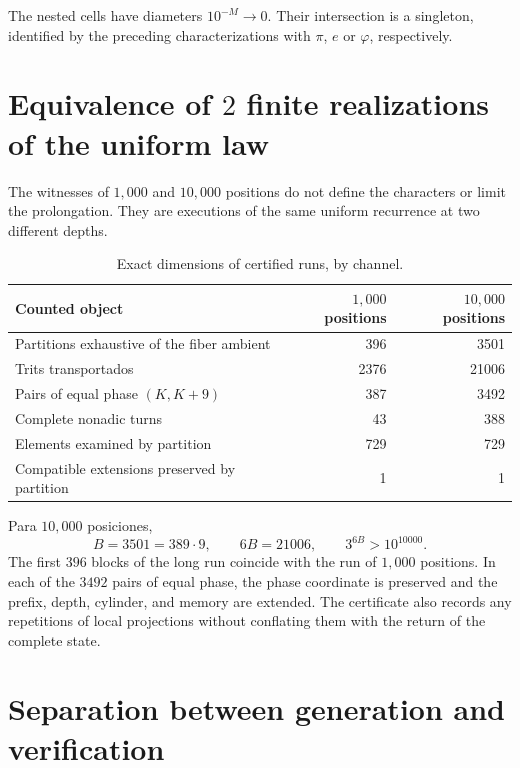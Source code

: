 \begin{corollary}
The nested cells have diameters \(10^{-M}\to0\). Their intersection is
a singleton, identified by the preceding characterizations with
\(\pi\), \(e\) or \(\varphi\), respectively.
\end{corollary}

\section{Equivalence of \(2\) finite realizations of the uniform law}

The witnesses of \(1,000\) and \(10,000\) positions do not define the
characters or limit the prolongation. They are executions of the same uniform
recurrence at two different depths.

\begin{table}[htbp]
\centering
\caption{Exact dimensions of certified runs, by channel.}
\label{gfp:b:tab:dimensiones-ejecuciones-1000-10000}
\begin{tabular}{lrr}
\toprule
Counted object & \(1,000\) positions & \(10,000\) positions\\
\midrule
Partitions exhaustive of the fiber ambient & 396 & 3501\\
Trits transportados & 2376 & 21006\\
Pairs of equal phase \((K,K+9)\) & 387 & 3492\\
Complete nonadic turns & 43 & 388\\
Elements examined by partition & 729 & 729\\
Compatible extensions preserved by partition & 1 & 1\\
\bottomrule
\end{tabular}
\end{table}

Para \(10,000\) posiciones,
\[
 B=3501=389\cdot9,
 \qquad
 6B=21006,
 \qquad
 3^{6B}>10^{10000}.
\]
The first \(396\) blocks of the long run coincide with the
run of \(1,000\) positions. In each of the \(3492\) pairs of
equal phase, the phase coordinate is preserved and the prefix, depth,
cylinder, and memory are extended. The certificate also records any
repetitions of local projections without conflating them with the return of
the complete state.

\section{Separation between generation and verification}

